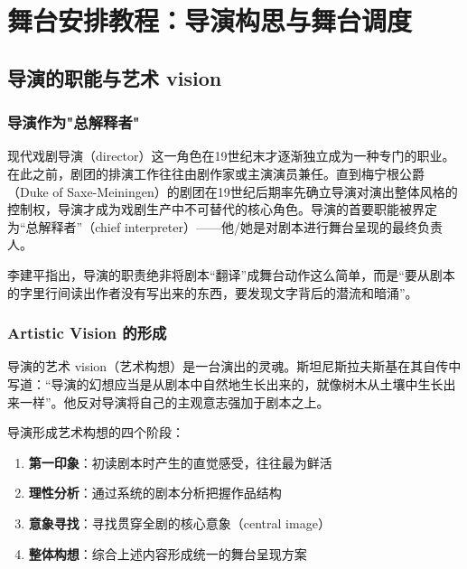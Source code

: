 \chapter{舞台安排教程：导演构思与舞台调度}


\section{导演的职能与艺术 vision}

\subsection{导演作为"总解释者"}

现代戏剧导演（director）这一角色在19世纪末才逐渐独立成为一种专门的职业。在此之前，剧团的排演工作往往由剧作家或主演演员兼任。直到梅宁根公爵（Duke of Saxe-Meiningen）的剧团在19世纪后期率先确立导演对演出整体风格的控制权，导演才成为戏剧生产中不可替代的核心角色。导演的首要职能被界定为\enquote{总解释者}（chief interpreter）——他/她是对剧本进行舞台呈现的最终负责人。

李建平指出，导演的职责绝非将剧本\enquote{翻译}成舞台动作这么简单，而是\enquote{要从剧本的字里行间读出作者没有写出来的东西，要发现文字背后的潜流和暗涌}\cite{li:directing}。

\subsection{Artistic Vision 的形成}

导演的艺术 vision（艺术构想）是一台演出的灵魂。斯坦尼斯拉夫斯基在其自传中写道：\enquote{导演的幻想应当是从剧本中自然地生长出来的，就像树木从土壤中生长出来一样}\cite{stanislavski:life}。他反对导演将自己的主观意志强加于剧本之上。

导演形成艺术构想的四个阶段：
\begin{enumerate}
  \item \textbf{第一印象}：初读剧本时产生的直觉感受，往往最为鲜活
  \item \textbf{理性分析}：通过系统的剧本分析把握作品结构
  \item \textbf{意象寻找}：寻找贯穿全剧的核心意象（central image）
  \item \textbf{整体构想}：综合上述内容形成统一的舞台呈现方案
\end{enumerate}

